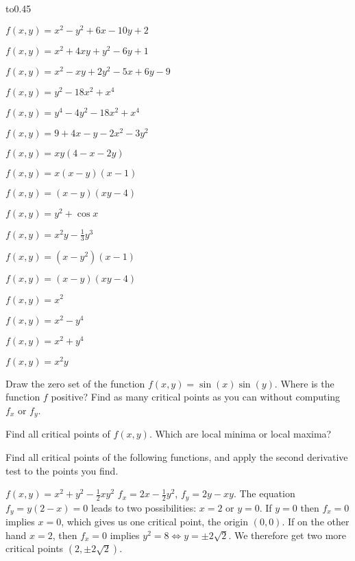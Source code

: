\begin{multicols}{2}
\subprob\hbox to0.45\textwidth{$f(x,y)=x^2+4y^2-2x+8y-1$\hfill} 

\subprob $f(x,y)=x^2-y^2+6x-10y+2$ 

\subprob $f(x,y)=x^2+4xy+y^2-6y+1$ 

\subprob $f(x,y)=x^2-xy+2y^2-5x+6y-9$ 

\subprob $f(x,y)=y^2-18 x^2+x^4$ 

\subprob $f(x,y)=y^4-4y^2-18 x^2+x^4$ 

\subprob $f(x,y)=9+4x-y-2x^2-3y^2$ 

\subprob $f(x,y)=xy(4-x-2y)$ 

\subprob $f(x,y)=x(x-y)(x-1)$ 

\subprob $f(x,y)=(x-y)(xy-4)$ 

\subprob $f(x,y)=y^2+\cos x$ 

\subprob $f(x,y)=x^2y-\frac13 y^3$ 

\subprob $f(x,y)=(x-y^2)(x-1)$ 

\subprob $f(x,y)=(x-y)(xy-4)$ 

\subprob $f(x,y)=x^2$ 

\subprob $f(x,y)=x^2-y^4$ 

\subprob $f(x,y)=x^2+y^4$ 

\subprob $f(x,y)=x^2y$ 


\problem %
\subprob Draw the zero set of the 
function $f(x, y) = \sin(x) \sin(y)$.
\subprob Where is the function $f$ positive? 
Find as many critical points as you can without computing $f_x$ or
$f_y$.

\subprob Find all critical points of $f(x, y)$.  
Which are local minima or local maxima?


\problem Find all critical points of the following functions, and
apply the second derivative test to the points you find.

\subprob 
$f(x, y) = x^2 + y^2 - \tfrac12 xy^2$
\answer 
$f_x = 2x-\frac12y^2$, $f_y = 2y-xy$.  
The equation $f_y=y(2-x)=0$ leads to two possibilities: $x=2$ or
$y=0$.  If $y=0$ then $f_x=0$ implies $x=0$, which gives us one
critical point, the origin $(0,0)$.  If on the other hand $x=2$, then
$f_x=0$ implies $y^2=8 \iff y=\pm2\sqrt{2}$.  We therefore get two
more critical points $(2, \pm 2\sqrt{2})$.


\end{multicols}

